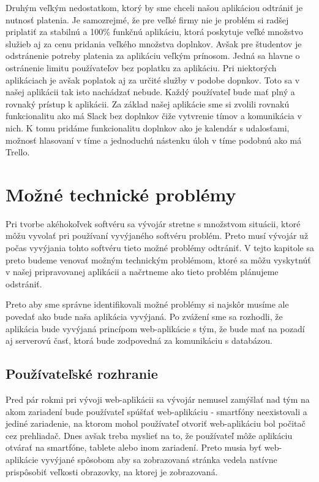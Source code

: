 \indent Druhým veľkým nedostatkom, ktorý by sme chceli našou aplikáciou odtrániť je nutnosť platenia. Je samozrejmé, že pre veľké firmy nie je problém si radšej priplatiť za stabilnú a 100\% funkčnú aplikáciu, ktorá poskytuje veľké množstvo služieb aj za cenu pridania veľkého množstva doplnkov. Avšak pre študentov je odstránenie potreby platenia za aplikáciu veľkým prínosom. Jedná sa hlavne o ostránenie limitu používateľov bez poplatku za aplikáciu. Pri niektorých aplikáciach je avšak poplatok aj za určité služby v podobe dopnkov. Toto sa v našej aplikácii tak isto nachádzať nebude. Každý používateľ bude mať plný a rovnaký prístup k aplikácii. Za základ našej aplikácie sme si zvolili rovnakú funkcionalitu ako má Slack bez doplnkov čiže vytvrenie tímov a komunikácia v nich. K tomu pridáme funkcionalitu doplnkov ako je kalendár s udalosťami, možnosť hlasovaní v tíme a jednoduchú nástenku úloh v tíme podobnú ako má Trello. 

\section{Možné technické problémy}
\indent Pri tvorbe akéhokoľvek softvéru sa vývojár stretne s množstvom situácii, ktoré môžu vyvolať pri používaní vyvýjaného softvéru problém. Preto musí vývojár už počas vyvýjania tohto softvéru tieto možné problémy odtrániť. V tejto kapitole sa preto budeme venovať možným technickým problémom, ktoré sa môžu vyskytnúť v našej pripravovanej aplikácii a načrtneme ako tieto problém plánujeme odstrániť.

\indent Preto aby sme správne identifikovali možné problémy si najskôr musíme ale povedať ako bude naša aplikácia vyvýjaná. Po zvážení sme sa rozhodli, že aplikácia bude vyvýjaná princípom web-aplikácie s tým, že bude mať na pozadí aj serverovú časť, ktorá bude zodpovedná za komunikáciu s databázou.

\subsection{Používateľské rozhranie}
\indent Pred pár rokmi pri vývoji web-aplikácii sa vývojár nemusel zamýšlať nad tým na akom zariadení bude používateľ spúšťať web-aplikáciu - smartfóny neexistovali a jediné zariadenie, na ktorom mohol používateľ otvoriť web-aplikáciu bol počitač cez prehliadač. Dnes avšak treba myslieť na to, že používateľ môže aplikáciu otvárať na smartfóne, tablete alebo inom zariadení. Preto musia byť web-aplikácie vyvýjané spôsobom aby sa zobrazovaná stránka vedela natívne prispôsobiť veľkosti obrazovky, na ktorej je zobrazovaná.

